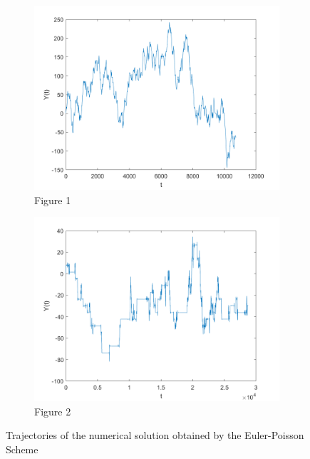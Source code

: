 \begin{figure}[h]
\centering
   \begin{subfigure}{0.6\linewidth} \centering
     \includegraphics[scale=0.4]{images/N1000T1n10.png}
     \caption{Figure 1}\label{fig:figA}
   \end{subfigure}
   \begin{subfigure}{0.6\linewidth} \centering
     \includegraphics[scale=0.4]{images/N10000T70n20.png}
     \caption{Figure 2}\label{fig:figB}
   \end{subfigure}
\caption{Trajectories of the numerical solution obtained by the Euler-Poisson Scheme} \label{fig:twofigs}
\end{figure}


